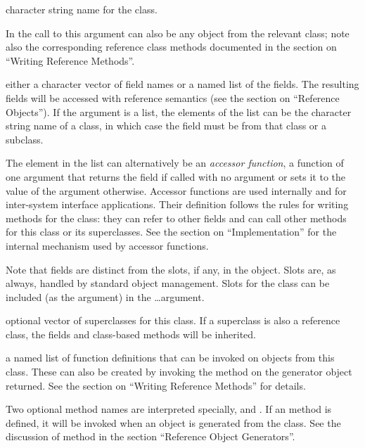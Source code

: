 %
\begin{Arguments}
\begin{ldescription}
\item[\code{Class}] 
character string name for the class.

In the call to  this argument can also be any
object from the relevant class;  note also the corresponding reference
class methods documented in the section on ``Writing Reference Methods''.

\item[\code{fields}] 
either a character vector of field names or
a named list of the fields.  The resulting fields will be accessed with reference semantics (see
the  section on ``Reference Objects'').  If the argument is a list, the
elements of the list can be the character string name of a class, in
which case the field must be from that class or a subclass.

The element in the list can alternatively be an \emph{accessor
function}, a function of one argument that returns
the field if called with no argument or sets it to the value of the
argument otherwise.
Accessor functions are used internally and for inter-system interface
applications.
Their definition follows the rules for writing methods for the class:
they can refer to other fields and can call other methods for this
class or its superclasses.
See the section on ``Implementation'' for the internal mechanism
used by accessor functions.

Note that fields are distinct from
the slots, if any, in the object.  Slots are, as always, handled by
standard \R{} object management.  Slots for the class can be included
(as the  argument) in the \dots argument.

\item[\code{contains}] 
optional vector of superclasses for this class.  If a superclass is
also a reference class, the fields and class-based methods will be inherited.

\item[\code{methods}] 
a named list of function definitions that can be invoked on objects
from this class.  These can also be created by invoking the
 method on the generator object returned. 
See the section on ``Writing Reference Methods'' for details.

Two optional method names are interpreted specially, 
and . If an  method is defined, it
will be invoked when an object is generated from the class.  See the
discussion of method  
in the section ``Reference Object Generators''.


\end{ldescription}
\end{Arguments}
